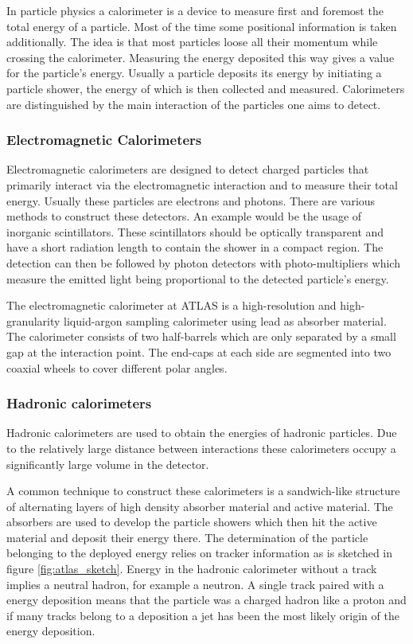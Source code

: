 In particle physics a calorimeter is a device to measure first and foremost the total energy of a particle. Most of the time some positional information is taken  additionally.
The idea is that most particles loose all their momentum while crossing the calorimeter. Measuring the energy deposited this way gives a value for the particle's energy.
Usually a particle deposits its energy by initiating a particle shower, the energy of which is then collected and measured.
Calorimeters are distinguished by the main interaction of the particles one aims to detect. 
\subsubsection{Electromagnetic Calorimeters}

Electromagnetic calorimeters are designed to detect charged particles that primarily interact via the electromagnetic interaction and to measure their total energy. Usually these particles are electrons and photons. There are various methods to construct these detectors. An example would be the usage of inorganic scintillators. These scintillators should be optically transparent and have a short radiation length to contain the shower in a compact region. The detection can then be followed by photon detectors with photo-multipliers which measure the emitted light being proportional to the detected particle's energy.

The electromagnetic calorimeter at ATLAS is a high-resolution and high-granularity liquid-argon sampling calorimeter using lead as absorber material. The calorimeter consists of two half-barrels which are only separated by a small gap at the interaction point. The end-caps at each side are segmented into two coaxial wheels to cover different polar angles.

\subsubsection{Hadronic calorimeters}

Hadronic calorimeters are used to obtain the energies of hadronic particles.
Due to the relatively large distance between interactions these calorimeters occupy a significantly large volume in the detector.

A common technique to construct these calorimeters is a sandwich-like structure of alternating layers of high density absorber material and active material. 
The absorbers are used to develop the particle showers which then hit the active material and deposit their energy there. The determination of the particle belonging to the deployed energy relies on tracker information as is sketched in figure \ref{fig:atlas_sketch}. Energy in the hadronic calorimeter without a track implies a neutral hadron, for example a neutron. A single track paired with a energy deposition means that the particle was a charged hadron like a proton and if many tracks belong to a deposition a jet has been the most likely origin of the energy deposition.


